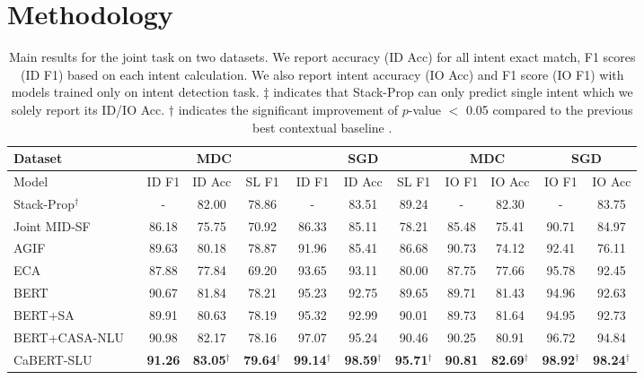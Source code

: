 \documentclass[a4paper]{article}
\begin{document}

\section{Methodology}

\begin{table}[ht]
\caption{Main results for the joint task on two datasets. We report accuracy (ID Acc) for all intent exact match, F1 scores (ID F1) based on each intent calculation. We also report intent accuracy (IO Acc) and F1 score (IO F1) with models trained only on intent detection task. $\ddagger$ indicates that Stack-Prop can only predict single intent which we solely report its ID/IO Acc. $\dagger$ indicates the significant improvement of $p$-value $<$ 0.05 compared to the previous best contextual baseline \cite{gupta2019casanlu}.} %
\footnotesize
\centering %
\hspace*{-0.7cm}
\begin{tabular}{l||c|c|c|c|c|c||c|c|c|c}
\toprule
\textbf{Dataset}
&\multicolumn{3}{|c}{\textbf{MDC}}
&\multicolumn{3}{|c}{\textbf{SGD}}
&\multicolumn{2}{||c}{\textbf{MDC}}
&\multicolumn{2}{|c}{\textbf{SGD}}\\
\midrule
\hline
Model & ID F1 & ID Acc & SL F1 & ID F1 & ID Acc & SL F1 & IO F1 & IO Acc & IO F1 & IO Acc \\
\hline
Stack-Prop$^\dagger$   ~\cite{qin2019stackpropagation}      & -     & 82.00 & 78.86 & -     & 83.51 & 89.24 & -     & 82.30 & -     & 83.75\\
Joint MID-SF ~\cite{Rash:19}                      & 86.18 & 75.75 & 70.92 & 86.33 & 85.11 & 78.21 & 85.48 & 75.41 & 90.71 & 84.97\\
AGIF         ~\cite{qin2020agif}                  & 89.63 & 80.18 & 78.87 & 91.96 & 85.41 & 86.68 & 90.73 & 74.12 & 92.41 & 76.11\\
ECA          ~\cite{chauhan20}                    & 87.88 & 77.84 & 69.20 & 93.65 & 93.11 & 80.00 & 87.75 & 77.66 & 95.78 & 92.45\\
\hline
BERT         ~\cite{devlin2019bert}               & 90.67 & 81.84 & 78.21 & 95.23 & 92.75 & 89.65 & 89.71 & 81.43 & 94.96 & 92.63\\
BERT+SA      ~\cite{lin2017structured}            & 89.91 & 80.63 & 78.19 & 95.32 & 92.99 & 90.01 & 89.73 & 81.64 & 94.95 & 92.73\\
BERT+CASA-NLU   ~\cite{gupta2019casanlu}          & 90.98 & 82.17 & 78.16 & 97.07 & 95.24 & 90.46 & 90.25 & 80.91 & 96.72 & 94.84\\
\hline
CaBERT-SLU          & \textbf{91.26} & \textbf{83.05}$^\dagger$	& \textbf{79.64}$^\dagger$	& \textbf{99.14}$^\dagger$	& \textbf{98.59}$^\dagger$	& \textbf{95.71}$^\dagger$
& \textbf{90.81} & \textbf{82.69}$^\dagger$ & \textbf{98.92}$^\dagger$ & \textbf{98.24}$^\dagger$\\
\bottomrule

\end{tabular}
\label{table:main} %
\end{table}
\end{document}
